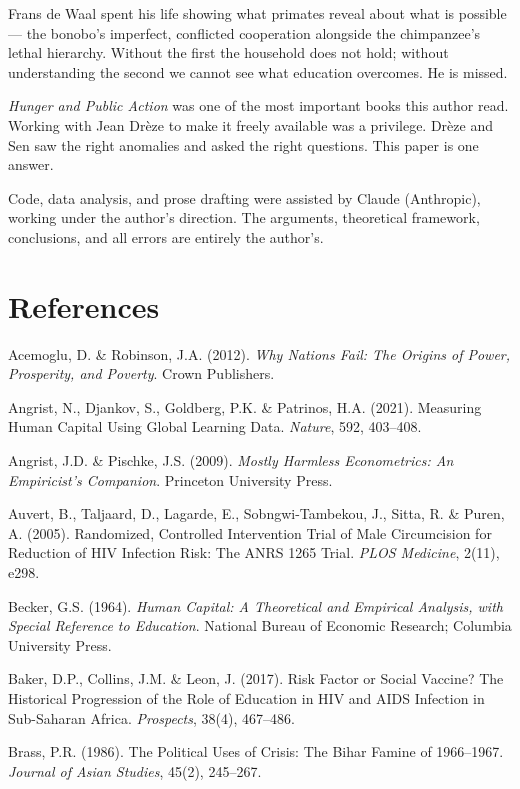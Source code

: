 \documentclass[12pt,letterpaper]{article}
\begin{document}
Frans de Waal spent his life showing what primates reveal about what
is possible --- the bonobo's imperfect, conflicted cooperation
alongside the chimpanzee's lethal hierarchy. Without the first the
household does not hold; without understanding the second we cannot
see what education overcomes. He is missed.

\emph{Hunger and Public Action} was one of the most important books
this author read. Working with Jean Drèze to make it freely available
was a privilege. Drèze and Sen saw the right anomalies and asked the
right questions. This paper is one answer.

Code, data analysis, and prose drafting were assisted by Claude
(Anthropic), working under the author's direction. The arguments,
theoretical framework, conclusions, and all errors are entirely the
author's.


\section*{References}\label{references}

Acemoglu, D. \& Robinson, J.A. (2012). \emph{Why Nations Fail: The
Origins of Power, Prosperity, and Poverty}. Crown Publishers.

Angrist, N., Djankov, S., Goldberg, P.K. \& Patrinos, H.A. (2021).
Measuring Human Capital Using Global Learning Data. \emph{Nature}, 592,
403--408.

Angrist, J.D. \& Pischke, J.S. (2009). \emph{Mostly Harmless
Econometrics: An Empiricist's Companion}. Princeton University Press.

Auvert, B., Taljaard, D., Lagarde, E., Sobngwi-Tambekou, J., Sitta, R.
\& Puren, A. (2005). Randomized, Controlled Intervention Trial of Male
Circumcision for Reduction of HIV Infection Risk: The ANRS 1265 Trial.
\emph{PLOS Medicine}, 2(11), e298.

Becker, G.S. (1964). \emph{Human Capital: A Theoretical and Empirical
Analysis, with Special Reference to Education}. National Bureau of
Economic Research; Columbia University Press.

Baker, D.P., Collins, J.M. \& Leon, J. (2017). Risk Factor or Social
Vaccine? The Historical Progression of the Role of Education in HIV and
AIDS Infection in Sub-Saharan Africa. \emph{Prospects}, 38(4), 467--486.

Brass, P.R. (1986). The Political Uses of Crisis: The Bihar Famine of
1966--1967. \emph{Journal of Asian Studies}, 45(2), 245--267.
\end{document}
